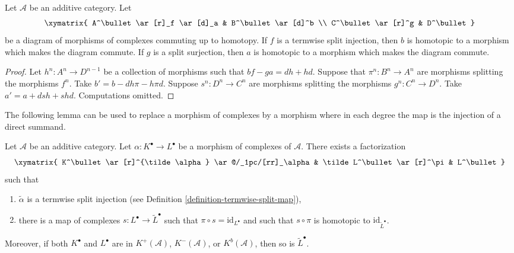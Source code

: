 \begin{lemma}
\label{lemma-make-commute-map}
Let $\mathcal{A}$ be an additive category.
Let
$$
\xymatrix{
A^\bullet \ar[r]_f \ar[d]_a & B^\bullet \ar[d]^b \\
C^\bullet \ar[r]^g & D^\bullet
}
$$
be a diagram of morphisms of complexes commuting up to homotopy.
If $f$ is a termwise split injection, then $b$ is homotopic to a
morphism which makes the diagram commute.
If $g$ is a split surjection, then $a$ is homotopic to a
morphism which makes the diagram commute.
\end{lemma}

\begin{proof}
Let $h^n : A^n \to D^{n - 1}$ be a collection of morphisms
such that $bf - ga = dh + hd$. Suppose that $\pi^n : B^n \to A^n$
are morphisms splitting the morphisms $f^n$.
Take $b' = b - dh\pi - h\pi d$.
Suppose $s^n : D^n \to C^n$ are morphisms splitting the morphisms
$g^n : C^n \to D^n$. Take $a' = a + dsh + shd$.
Computations omitted.
\end{proof}

\noindent
The following lemma can be used to replace a morphism of complexes
by a morphism where in each degree the map is the injection of a
direct summand.

\begin{lemma}
\label{lemma-make-injective}
Let $\mathcal{A}$ be an additive category.
Let $\alpha : K^\bullet \to L^\bullet$ be a morphism
of complexes of $\mathcal{A}$.
There exists a factorization
$$
\xymatrix{
K^\bullet \ar[r]^{\tilde \alpha} \ar@/_1pc/[rr]_\alpha &
\tilde L^\bullet \ar[r]^\pi &
L^\bullet
}
$$
such that
\begin{enumerate}
\item $\tilde \alpha$ is a termwise split injection (see
Definition \ref{definition-termwise-split-map}),
\item there is a map of complexes $s : L^\bullet \to \tilde L^\bullet$
such that $\pi \circ s = \text{id}_{L^\bullet}$ and such that
$s \circ \pi$ is homotopic to $\text{id}_{\tilde L^\bullet}$.
\end{enumerate}
Moreover, if both $K^\bullet$ and $L^\bullet$ are in
$K^{+}(\mathcal{A})$, $K^{-}(\mathcal{A})$, or $K^b(\mathcal{A})$,
then so is $\tilde L^\bullet$.
\end{lemma}

